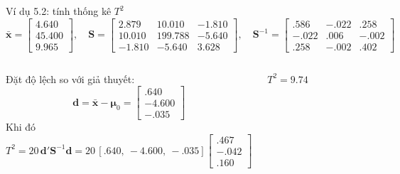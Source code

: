 \begin{frame}{Ví dụ 5.2: tính thống kê \texorpdfstring{\(T^2\)}{T2}}
  \small
  \vspace{-0.1cm}
  \[
    \bar{\mathbf{x}} =
    \begin{bmatrix} 4.640 \\ 45.400 \\ 9.965 \end{bmatrix},
    \quad
    \mathbf{S}=
    \begin{bmatrix}
      2.879 & 10.010 & -1.810 \\
      10.010 & 199.788 & -5.640 \\
      -1.810 & -5.640 & 3.628
    \end{bmatrix},
    \quad
    \mathbf{S}^{-1}=
    \begin{bmatrix}
      .586 & -.022 & .258 \\
      -.022 & .006 & -.002 \\
      .258 & -.002 & .402
    \end{bmatrix}
  \]
  \vspace{-0.05cm}
  \begin{columns}[T,onlytextwidth]
    Đặt độ lệch so với giả thuyết:
    \[
      \mathbf{d}
      = \bar{\mathbf{x}}-\boldsymbol{\mu}_0
      = \begin{bmatrix} .640 \\ -4.600 \\ -.035 \end{bmatrix}
    \]
    Khi đó
    \[
      T^2 = 20\,\mathbf{d}'\mathbf{S}^{-1}\mathbf{d}
      = 20\,[.640,\ -4.600,\ -.035]
      \begin{bmatrix} .467 \\ -.042 \\ .160 \end{bmatrix}
    \]
    \vspace{-0.1cm}
    \begin{center}
      \colorbox{hustnavy!8}{\large\(T^2 = 9.74\)}
    \end{center}
  \end{columns}
\end{frame}

